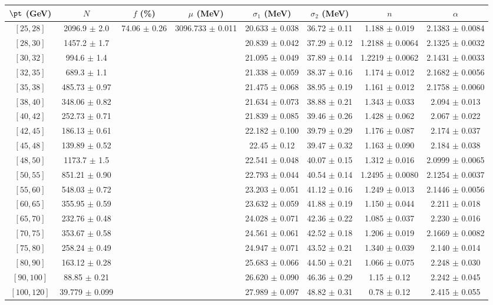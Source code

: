 \begin{tabular}{c||c|c|c|c|c|c|c}
$\pt$ (GeV) & $N$ & $f$ (\%) & $\mu$ (MeV) & $\sigma_1$ (MeV) & $\sigma_2$ (MeV) & $n$ & $\alpha$ \\
\hline
$[25, 28]$ & 2096.9 $\pm$ 2.0 & \multirow{19}{*}{74.06 $\pm$ 0.26} & \multirow{19}{*}{3096.733 $\pm$ 0.011} & 20.633 $\pm$ 0.038 & 36.72 $\pm$ 0.11 & 1.188 $\pm$ 0.019 & 2.1383 $\pm$ 0.0084\\
$[28, 30]$ & 1457.2 $\pm$ 1.7 &  &  & 20.839 $\pm$ 0.042 & 37.29 $\pm$ 0.12 & 1.2188 $\pm$ 0.0064 & 2.1325 $\pm$ 0.0032\\
$[30, 32]$ & 994.6 $\pm$ 1.4 &  &  & 21.095 $\pm$ 0.049 & 37.89 $\pm$ 0.14 & 1.2219 $\pm$ 0.0062 & 2.1431 $\pm$ 0.0033\\
$[32, 35]$ & 689.3 $\pm$ 1.1 &  &  & 21.338 $\pm$ 0.059 & 38.37 $\pm$ 0.16 & 1.174 $\pm$ 0.012 & 2.1682 $\pm$ 0.0056\\
$[35, 38]$ & 485.73 $\pm$ 0.97 &  &  & 21.475 $\pm$ 0.068 & 38.95 $\pm$ 0.19 & 1.161 $\pm$ 0.012 & 2.1758 $\pm$ 0.0060\\
$[38, 40]$ & 348.06 $\pm$ 0.82 &  &  & 21.634 $\pm$ 0.073 & 38.88 $\pm$ 0.21 & 1.343 $\pm$ 0.033 & 2.094 $\pm$ 0.013\\
$[40, 42]$ & 252.73 $\pm$ 0.71 &  &  & 21.839 $\pm$ 0.085 & 39.46 $\pm$ 0.26 & 1.428 $\pm$ 0.062 & 2.067 $\pm$ 0.022\\
$[42, 45]$ & 186.13 $\pm$ 0.61 &  &  & 22.182 $\pm$ 0.100 & 39.79 $\pm$ 0.29 & 1.176 $\pm$ 0.087 & 2.174 $\pm$ 0.037\\
$[45, 48]$ & 139.89 $\pm$ 0.52 &  &  & 22.45 $\pm$ 0.12 & 39.47 $\pm$ 0.32 & 1.163 $\pm$ 0.090 & 2.184 $\pm$ 0.038\\
$[48, 50]$ & 1173.7 $\pm$ 1.5 &  &  & 22.541 $\pm$ 0.048 & 40.07 $\pm$ 0.15 & 1.312 $\pm$ 0.016 & 2.0999 $\pm$ 0.0065\\
$[50, 55]$ & 851.21 $\pm$ 0.90 &  &  & 22.793 $\pm$ 0.044 & 40.54 $\pm$ 0.14 & 1.2495 $\pm$ 0.0080 & 2.1254 $\pm$ 0.0037\\
$[55, 60]$ & 548.03 $\pm$ 0.72 &  &  & 23.203 $\pm$ 0.051 & 41.12 $\pm$ 0.16 & 1.249 $\pm$ 0.013 & 2.1446 $\pm$ 0.0056\\
$[60, 65]$ & 355.95 $\pm$ 0.59 &  &  & 23.632 $\pm$ 0.059 & 41.88 $\pm$ 0.19 & 1.150 $\pm$ 0.044 & 2.211 $\pm$ 0.018\\
$[65, 70]$ & 232.76 $\pm$ 0.48 &  &  & 24.028 $\pm$ 0.071 & 42.36 $\pm$ 0.22 & 1.085 $\pm$ 0.037 & 2.230 $\pm$ 0.016\\
$[70, 75]$ & 353.67 $\pm$ 0.58 &  &  & 24.561 $\pm$ 0.061 & 42.52 $\pm$ 0.18 & 1.206 $\pm$ 0.019 & 2.1669 $\pm$ 0.0082\\
$[75, 80]$ & 258.24 $\pm$ 0.49 &  &  & 24.947 $\pm$ 0.071 & 43.52 $\pm$ 0.21 & 1.340 $\pm$ 0.039 & 2.140 $\pm$ 0.014\\
$[80, 90]$ & 163.12 $\pm$ 0.28 &  &  & 25.683 $\pm$ 0.066 & 44.50 $\pm$ 0.21 & 1.066 $\pm$ 0.075 & 2.248 $\pm$ 0.030\\
$[90, 100]$ & 88.85 $\pm$ 0.21 &  &  & 26.620 $\pm$ 0.090 & 46.36 $\pm$ 0.29 & 1.15 $\pm$ 0.12 & 2.242 $\pm$ 0.045\\
$[100, 120]$ & 39.779 $\pm$ 0.099 &  &  & 27.989 $\pm$ 0.097 & 48.82 $\pm$ 0.31 & 0.78 $\pm$ 0.12 & 2.415 $\pm$ 0.055\\
\end{tabular}
